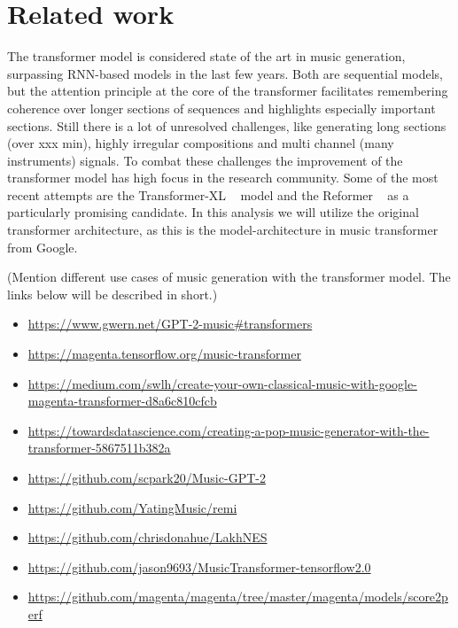 \documentclass{article}
\begin{document}
    \section{Related work}
       The transformer model is considered state of the art in music generation,
       surpassing RNN-based models in the last few years. Both are sequential models,
       but the attention principle at the core of the transformer facilitates
       remembering coherence over longer sections of sequences and highlights
       especially important sections. Still there is a lot of unresolved challenges,
       like generating long sections (over xxx min), highly irregular compositions
       and multi channel (many instruments) signals. To combat these challenges the
       improvement of the transformer model has high focus in the research community.
       Some of the most recent attempts are the Transformer-XL ~\cite{dai2019transformerxl} 
       model and the Reformer ~\cite{kitaev2020reformer} as a particularly promising candidate. In          this analysis we will utilize the original transformer architecture, as this is the
       model-architecture in music transformer from Google.
        
        (Mention different use cases of music generation with the transformer model.
        The links below will be described in short.)
        
        \begin{itemize}
            \item \url{https://www.gwern.net/GPT-2-music#transformers}
            \item \url{https://magenta.tensorflow.org/music-transformer}
            \item \url{https://medium.com/swlh/create-your-own-classical-music-with-google-magenta-transformer-d8a6c810cfcb}
            \item \url{https://towardsdatascience.com/creating-a-pop-music-generator-with-the-transformer-5867511b382a}
            \item \url{https://github.com/scpark20/Music-GPT-2}
            \item \url{https://github.com/YatingMusic/remi}
            \item \url{https://github.com/chrisdonahue/LakhNES}
            \item \url{https://github.com/jason9693/MusicTransformer-tensorflow2.0}
            \item \url{https://github.com/magenta/magenta/tree/master/magenta/models/score2perf}
        \end{itemize}
\end{document}
